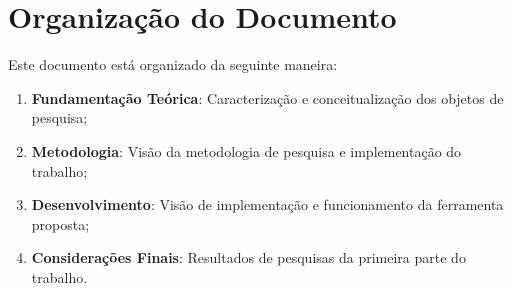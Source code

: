 \section{Organização do Documento}
\label{sec:org}

Este documento está organizado da seguinte maneira:

\begin{enumerate}
  \item \textbf{Fundamentação Teórica}: Caracterização e conceitualização dos
    objetos de pesquisa;
  \item \textbf{Metodologia}: Visão da metodologia de pesquisa e implementação
    do trabalho;
  \item \textbf{Desenvolvimento}: Visão de implementação e funcionamento da
    ferramenta proposta;
  \item \textbf{Considerações Finais}: Resultados de pesquisas da primeira
    parte do trabalho.
\end{enumerate}


